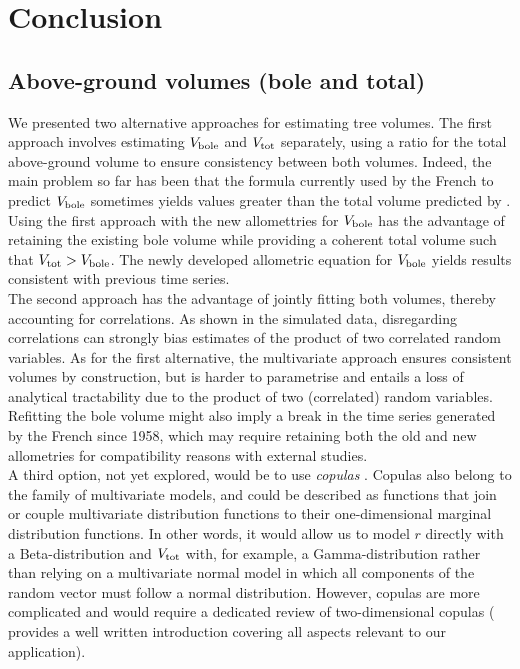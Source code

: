 \chapter{Conclusion\label{chap::conclusion}}

\section{Above-ground volumes (bole and total)}
We presented two alternative approaches for estimating tree volumes. The first approach involves estimating \( V_{\text{bole}} \) and \( V_{\text{tot}} \) separately, using a ratio for the total above-ground volume to ensure consistency between both volumes. Indeed, the main problem so far has been that the formula currently used by the French \NFI{} to predict \( V_{\text{bole}} \) \parencite{Morneau2016} sometimes yields values greater than the total volume predicted by \cite{Vallet2006}. Using the first approach with the new allomettries for \( V_{\text{bole}} \) has the advantage of retaining the existing \NFI{} bole volume while providing a coherent total volume such that \( V_{\text{tot}} > V_{\text{bole}} \). The newly developed allometric equation for \( V_{\text{bole}} \) yields results consistent with previous time series. \\

The second approach has the advantage of jointly fitting both volumes, thereby accounting for correlations. As shown in the simulated data, disregarding correlations can strongly bias estimates of the product of two correlated random variables. As for the first alternative, the multivariate approach ensures consistent volumes by construction, but is harder to parametrise and entails a loss of analytical tractability due to the product of two (correlated) random variables. Refitting the bole volume might also imply a break in the time series generated by the French \NFI{} since 1958, which may require retaining both the old and new allometries for compatibility reasons with external studies. \\

A third option, not yet explored, would be to use \textit{copulas} \parencite{Nelsen2006}. Copulas also belong to the family of multivariate models, and could be described as functions that join or couple multivariate distribution functions to their one-dimensional marginal distribution functions. In other words, it would allow us to model \( r \) directly with a Beta-distribution and \( V_{\text{tot}} \) with, for example, a Gamma-distribution rather than relying on a multivariate normal model in which all components of the random vector must follow a normal distribution. However, copulas are more complicated and would require a dedicated review of two-dimensional copulas (\textcite{Nelsen2006} provides a well written introduction covering all aspects relevant to our application).

